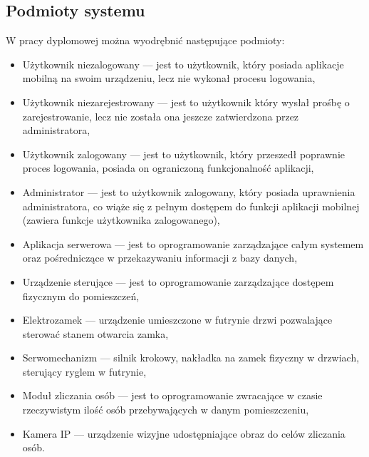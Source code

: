 \subsection{Podmioty systemu} 
W pracy dyplomowej można wyodrębnić następujące podmioty:
	\begin{itemize}
	\item {Użytkownik niezalogowany} --- jest to użytkownik, który posiada aplikacje mobilną na swoim urządzeniu, lecz nie wykonał procesu logowania,
	\item {Użytkownik niezarejestrowany} --- jest to użytkownik który wysłał prośbę o zarejestrowanie, lecz nie została ona jeszcze zatwierdzona przez administratora,
	\item {Użytkownik zalogowany} --- jest to użytkownik, który przeszedł poprawnie proces logowania, posiada on ograniczoną funkcjonalność aplikacji,
	\item {Administrator} --- jest to użytkownik zalogowany, który posiada uprawnienia administratora, co wiąże się z pełnym dostępem do funkcji aplikacji mobilnej (zawiera funkcje użytkownika zalogowanego),
	\item {Aplikacja serwerowa} --- jest to oprogramowanie zarządzające całym systemem oraz pośredniczące w przekazywaniu informacji z bazy danych,
	\item {Urządzenie sterujące} --- jest to oprogramowanie zarządzające dostępem fizycznym do pomieszczeń,
	\item {Elektrozamek} --- urządzenie umieszczone w futrynie drzwi pozwalające sterować stanem otwarcia zamka,
	\item {Serwomechanizm} --- silnik krokowy, nakładka na zamek fizyczny w drzwiach, sterujący ryglem w futrynie,
	\item {Moduł zliczania osób} --- jest to oprogramowanie zwracające w czasie rzeczywistym ilość osób przebywających w danym pomieszczeniu,
	\item {Kamera IP} --- urządzenie wizyjne udostępniające obraz do celów zliczania osób.
\end{itemize}